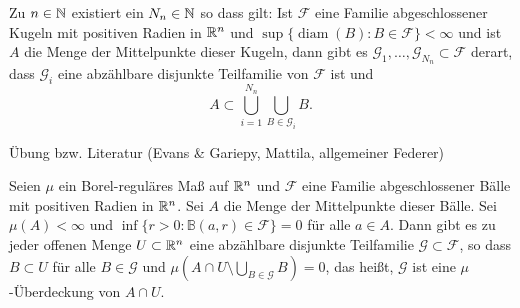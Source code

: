 \documentclass[a4paper,twoside,DIV15,BCOR12mm]{scrbook}
\DeclareMathOperator{\diam}{diam}
\begin{document}
\begin{satz}[Besicovitch]
\label{satz:2.8}
Zu $n\in\mathbb{N}$ existiert ein $N_n\in\mathbb{N}$ so dass gilt: Ist $\mathcal F$ eine Familie abgeschlossener Kugeln mit positiven Radien in $\mathbb{R}^n$ und $\sup\{\diam(B):B\in\mathcal F\}<\infty$ und ist $A$ die Menge der Mittelpunkte dieser Kugeln, dann gibt es $\mathcal G_1,\ldots,\mathcal G_{N_n}\subset \mathcal F$ derart, dass $\mathcal G_i$ eine abzählbare disjunkte Teilfamilie von $\mathcal F$ ist und
\[
A\subset \bigcup_{i=1}^{N_n} \bigcup_{B\in\mathcal G_i}B.
\]
\end{satz}

\begin{beweis} 
Übung bzw. Literatur (Evans \& Gariepy, Mattila, allgemeiner Federer)
\end{beweis}

\begin{korollar}
\label{kor:2.9}
Seien $\mu$ ein Borel-reguläres Maß auf $\mathbb{R}^n$ und $\mathcal F$ eine Familie abgeschlossener Bälle mit positiven Radien in $\mathbb{R}^n$. Sei $A$ die Menge der Mittelpunkte dieser Bälle. Sei $\mu(A)<\infty$ und $\inf\{r>0: \mathbb B(a,r)\in\mathcal F\}=0$ für alle $a\in A$. Dann gibt es zu jeder offenen Menge $ U \subset\mathbb{R}^n$ eine abzählbare disjunkte Teilfamilie $\mathcal G\subset\mathcal F$, so dass $B\subset U$ für alle $B\in \mathcal G$ und $\mu(A\cap U \setminus \bigcup_{B\in\mathcal G}B)=0$, das heißt, $\mathcal G$ ist eine $\mu$-Überdeckung von $A\cap U$.
\end{korollar}
\end{document}
